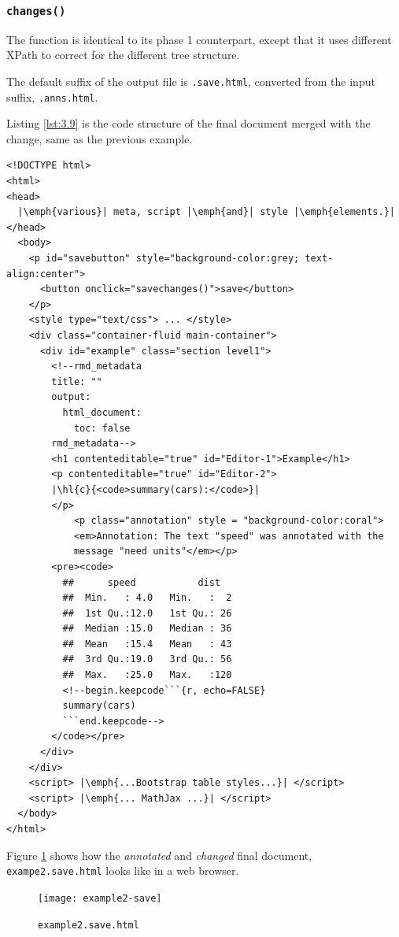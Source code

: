 \documentclass[a4paper, 12pt]{report}
\begin{document}
\subsubsection*{\texttt{changes()}}
The function is identical to its phase 1 counterpart, except that it uses different XPath to correct for the different tree structure.

The default suffix of the output file is \texttt{.save.html}, converted from the input suffix, \texttt{.anns.html}.

Listing \ref{lst:3.9} is the code structure of the final document merged with the change, same as the previous example.
\begin{lstlisting}[caption={(tidied) \texttt{example2.save.html}}, escapechar=\|, label={lst:3.9}]
<!DOCTYPE html>
<html>
<head>
  |\emph{various}| meta, script |\emph{and}| style |\emph{elements.}|
</head>
  <body>
    <p id="savebutton" style="background-color:grey; text-align:center">
      <button onclick="savechanges()">save</button>
    </p>
    <style type="text/css"> ... </style>
    <div class="container-fluid main-container">
      <div id="example" class="section level1">
        <!--rmd_metadata
        title: ""
        output:
          html_document:
            toc: false
        rmd_metadata-->
        <h1 contenteditable="true" id="Editor-1">Example</h1>
        <p contenteditable="true" id="Editor-2">
        |\hl{c}{<code>summary(cars):</code>}|
        </p>
            <p class="annotation" style = "background-color:coral">
            <em>Annotation: The text "speed" was annotated with the
            message "need units"</em></p>
        <pre><code>
          ##      speed           dist    
    	  ##  Min.   : 4.0   Min.   :  2  
    	  ##  1st Qu.:12.0   1st Qu.: 26  
    	  ##  Median :15.0   Median : 36  
    	  ##  Mean   :15.4   Mean   : 43  
    	  ##  3rd Qu.:19.0   3rd Qu.: 56  
    	  ##  Max.   :25.0   Max.   :120
    	  <!--begin.keepcode```{r, echo=FALSE}
    	  summary(cars)
    	  ```end.keepcode-->
    	</code></pre>
      </div>
    </div>
    <script> |\emph{...Bootstrap table styles...}| </script>
    <script> |\emph{... MathJax ...}| </script>    
  </body>
</html>
\end{lstlisting}

Figure \ref{fig:3.5} shows how the \emph{annotated} and \emph{changed} final document, \texttt{exampe2.save.html} looks like in a web browser.
\begin{figure}[h]
\texttt{[image: example2-save]}
\caption{\texttt{example2.save.html}}
\label{fig:3.5}
\end{figure}
\end{document}
